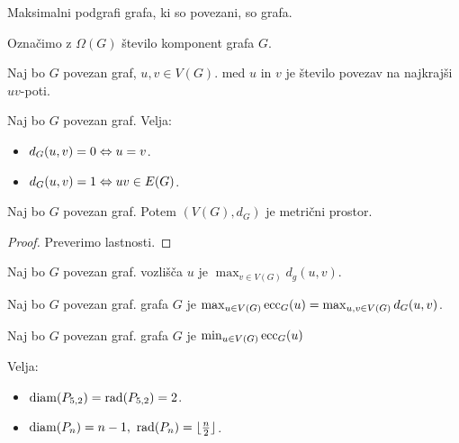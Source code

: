 \begin{definicija}
    Maksimalni podgrafi grafa, ki so povezani, so  grafa. 
\end{definicija}
Označimo z $\Omega(G)$ število komponent grafa $G$.

\begin{definicija}
    Naj bo $G$ povezan graf, $u, v \in V(G)$.  med $u$ in $v$ je število povezav na najkrajši $uv$-poti.
\end{definicija}

\begin{opomba}
    Naj bo $G$ povezan graf. Velja:
    \begin{itemize}
        \item $d_G(u,v) = 0 \Leftrightarrow u = v$.
        \item $d_G(u,v) = 1 \Leftrightarrow uv \in E(G)$.
    \end{itemize}
\end{opomba}

\begin{trditev}
    Naj bo $G$ povezan graf. Potem $(V(G), d_G)$ je metrični prostor.
\end{trditev}

\begin{proof}
    Preverimo lastnosti.
\end{proof}

\newpage
\begin{definicija}
    Naj bo $G$ povezan graf.  vozlišča $u$ je $\max_{v \in V(G)} d_g(u,v)$.
\end{definicija}

\begin{definicija}
    Naj bo $G$ povezan graf.  grafa $G$ je $\max_{u \in V(G)} \operatorname{ecc}_G(u) = \max_{u,v \in V(G)} d_G(u,v)$.
\end{definicija}

\begin{definicija}
    Naj bo $G$ povezan graf.  grafa $G$ je $\min_{u \in V(G)} \operatorname{ecc}_G(u)$
\end{definicija}

\begin{primer}
    Velja:
    \begin{itemize}
        \item $\operatorname{diam}(P_{5,2}) = \operatorname{rad}(P_{5,2}) = 2$.
        \item $\operatorname{diam}(P_n) = n-1, \ \operatorname{rad}(P_n) = \lfloor \frac{n}{2} \rfloor$.
    \end{itemize} 
\end{primer}

